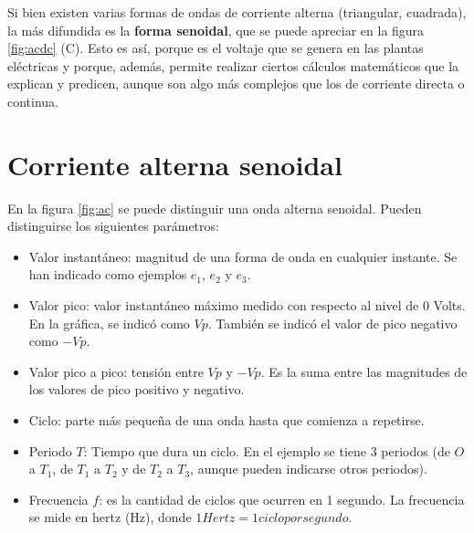 Si bien existen varias formas de ondas de corriente alterna (triangular, cuadrada), la más difundida es la \textbf{forma senoidal}, que se puede apreciar en la figura \ref{fig:acdc} (C). Esto es así, porque es el voltaje que se genera en las plantas eléctricas y porque, además, permite realizar ciertos cálculos matemáticos que la explican y predicen, aunque son algo más complejos que los de corriente directa o continua.

\section{Corriente alterna senoidal}

En la figura \ref{fig:ac} se puede distinguir una onda alterna senoidal. Pueden distinguirse los siguientes parámetros:

\begin{itemize}
	\item Valor instantáneo: magnitud de una forma de onda en cualquier instante. Se han indicado como ejemplos $e_1$, $e_2$ y $e_3$.
	\item Valor pico: valor instantáneo máximo medido con respecto al nivel de 0 Volts. En la gráfica, se indicó como $Vp$. También se indicó el valor de pico negativo como $-Vp$.
	\item Valor pico a pico: tensión entre $Vp$ y $-Vp$. Es la suma entre las magnitudes de los valores de pico positivo y negativo.
	\item Ciclo: parte más pequeña de una onda hasta que comienza a repetirse.	
	\item Periodo $T$: Tiempo que dura un ciclo. En el ejemplo se tiene 3 periodos (de $O$ a $T_1$, de $T_1$ a $T_2$ y de $T_2$ a $T_3$, aunque pueden indicarse otros periodos).
	\item Frecuencia $f$: es la cantidad de ciclos que ocurren en 1 segundo. La frecuencia se mide en hertz (Hz), donde $1 Hertz = 1 ciclo por segundo$.
\end{itemize}

